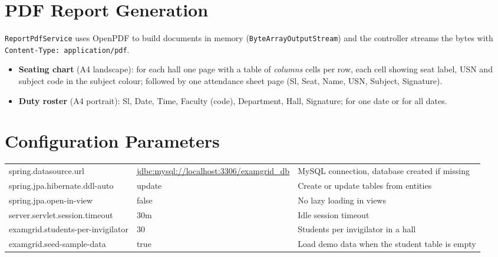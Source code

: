\documentclass[11pt,a4paper]{article}
\begin{document}
\section{PDF Report Generation}
\texttt{ReportPdfService} uses OpenPDF to build documents in memory (\texttt{ByteArrayOutputStream}) and the controller streams the bytes with \texttt{Content-Type: application/pdf}.
\begin{itemize}
  \item \textbf{Seating chart} (A4 landscape): for each hall one page with a table of \emph{columns} cells per row, each cell showing seat label, USN and subject code in the subject colour; followed by one attendance sheet page (Sl, Seat, Name, USN, Subject, Signature).
  \item \textbf{Duty roster} (A4 portrait): Sl, Date, Time, Faculty (code), Department, Hall, Signature; for one date or for all dates.
\end{itemize}

\section{Configuration Parameters}
\begin{tabularx}{\linewidth}{|L{5.6cm}|L{3.6cm}|X|}
\hline\headrow{} &  & \\\hline
spring.datasource.url & \url{jdbc:mysql://localhost:3306/examgrid_db} & MySQL connection, database created if missing\\\hline
spring.jpa.hibernate.ddl-auto & update & Create or update tables from entities\\\hline
spring.jpa.open-in-view & false & No lazy loading in views\\\hline
server.servlet.session.timeout & 30m & Idle session timeout\\\hline
examgrid.students-per-invigilator & 30 & Students per invigilator in a hall\\\hline
examgrid.seed-sample-data & true & Load demo data when the student table is empty\\\hline
\end{tabularx}
\end{document}
